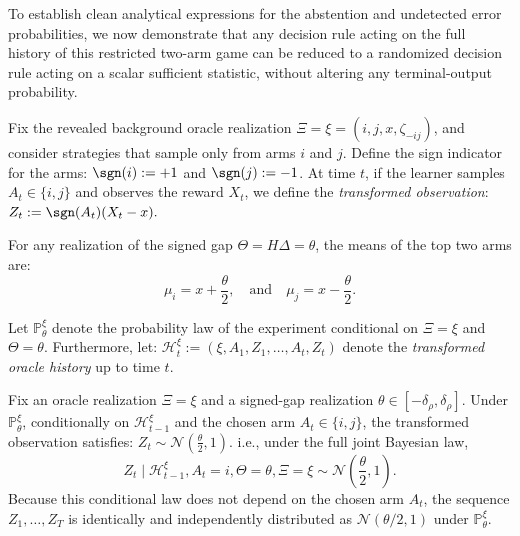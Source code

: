 \documentclass[10pt]{article}
\theoremstyle{plain}
\begin{document}
To establish clean analytical expressions for the abstention and undetected error probabilities, we now demonstrate that any decision rule acting on the full history of this restricted two-arm game can be reduced to a randomized decision rule acting on a   scalar sufficient statistic, without altering any terminal-output probability.

Fix the revealed background oracle realization $\Xi=\xi=(i,j,x,\zeta_{-ij})$, and consider strategies that sample only from arms $i$ and $j$. Define the sign indicator for the arms: $\sgn(i):=+1$ and $\sgn(j):=-1$. At time $t$, if the learner samples $A_t\in\{i,j\}$ and observes the reward $X_t$, we define the {\em transformed observation}: $Z_t:=\sgn(A_t)(X_t-x).$


For any realization of the signed gap $\Theta=H\Delta=\theta$, the means of the top two arms are:
$$\mu_i=x+\frac{\theta}{2}, \quad\mbox{and}\quad \mu_j=x-\frac{\theta}{2}.$$

Let $\mathbb{P}_\theta^\xi$ denote the probability law of the experiment conditional on $\Xi=\xi$ and $\Theta=\theta$. Furthermore, let:
$\mathcal{H}_t^\xi:=(\xi,A_1,Z_1,\dots,A_t,Z_t)$
denote the \emph{transformed oracle history} up to time $t$.

\begin{lemma}
\label{lem:local-transformed-iid}
Fix an oracle realization $\Xi=\xi$ and a signed-gap realization $\theta\in[-\delta_{\rho},\delta_{\rho}]$. Under $\mathbb{P}_\theta^\xi$, conditionally on $\mathcal{H}_{t-1}^\xi$ and the chosen arm $A_t\in\{i,j\}$, the transformed observation satisfies:
$Z_t \sim \mathcal{N}\!\left(\frac{\theta}{2},1\right).$
i.e., under the full joint Bayesian law, 
\begin{equation}
    Z_t \mid \mathcal{H}_{t-1}^{\xi},A_t=i,\Theta=\theta,\Xi=\xi \sim \mathcal{N}\!\left(\frac{\theta}{2},1\right). \label{eqn:Z_t}
\end{equation}
Because this conditional law does not depend on the chosen arm $A_t$, the sequence $Z_1,\dots,Z_T$ is identically and independently distributed as $\mathcal{N}(\theta/2,1)$ under $\mathbb{P}_\theta^\xi$.
\end{lemma}
\end{document}
